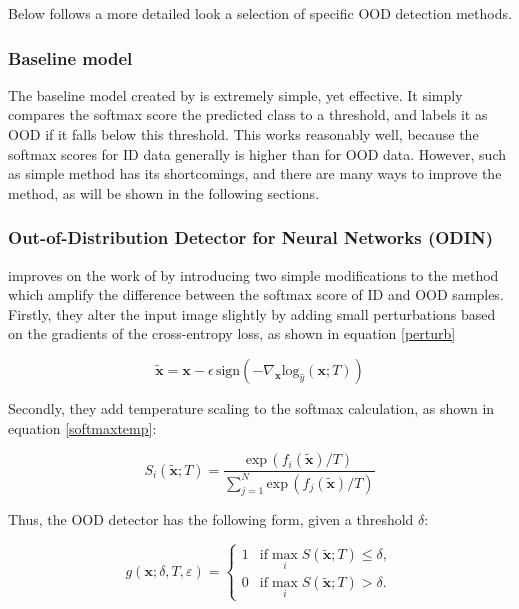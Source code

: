\documentclass[UKenglish]{uiomasterthesis} %
\theoremstyle{definition}
\begin{document}
Below follows a more detailed look a selection of specific OOD detection methods.

\subsubsection{Baseline model} \label{ood_baseline}

The baseline model created by \cite{oodbaseline} is extremely simple, yet effective. It simply compares the softmax score the predicted class to a threshold, and labels it as OOD if it falls below this threshold. This works reasonably well, because the softmax scores for ID data generally is higher than for OOD data. However, such as simple method has its shortcomings, and there are many ways to improve the method, as will be shown in the following sections.
\\

\subsubsection{Out-of-Distribution Detector for Neural Networks (ODIN)} \label{ood_odin}

\cite{odin} improves on the work of \cite{oodbaseline} by introducing two simple modifications to the method which amplify the difference between the softmax score of ID and OOD samples. Firstly, they alter the input image slightly by adding small perturbations based on the gradients of the cross-entropy loss, as shown in equation \ref{perturb}

\begin{equation}
\tilde{\bm{x}} = \bm{x} - \epsilon \, \text{sign}(-\nabla_{\bm{x}} \text{log}_{\hat{y}}(\bm{x};T))
\label{perturb}
\end{equation}

Secondly, they add temperature scaling to the softmax calculation, as shown in equation \ref{softmaxtemp}:

\begin{equation}
S_i(\tilde{\bm{x}} ; T) = \frac{\text{exp} \, (f_i(\tilde{\bm{x}})/T)}{\sum^N_{j=1} \text{exp} \, (f_j(\tilde{\bm{x}})/T)}
\label{softmaxtemp}
\end{equation}

Thus, the OOD detector has the following form, given a threshold $\delta$:

\begin{equation}
g(\bm{x};\delta,T,\varepsilon)=\left\{\begin{matrix}1&\text{if} \max_{i}S(\tilde{\bm{x}};T)\le\delta,\\ 0&\text{if} \max_{i}S(\tilde{\bm{x}};T)>\delta. \end{matrix}\right.
\label{fullodin}
\end{equation}
\end{document}
